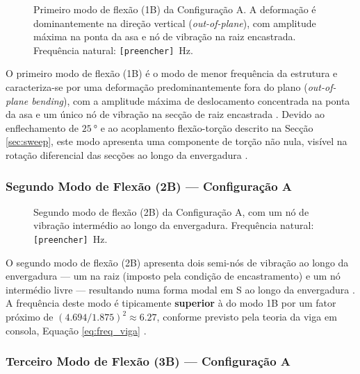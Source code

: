 \documentclass[a4paper,fleqn,noprintline]{cas-dc}
\begin{document}
\begin{figure}[h!]
    \centering
    \caption{Primeiro modo de flexão (1B) da Configuração A. 
    A deformação é dominantemente na direção vertical 
    (\textit{out-of-plane}), com amplitude máxima na ponta 
    da asa e nó de vibração na raiz encastrada. 
    Frequência natural: \texttt{[preencher]}~\si{\hertz}.}
    \label{fig:modo1a}
\end{figure}

O primeiro modo de flexão (1B) é o modo de menor frequência da estrutura e caracteriza-se por uma deformação predominantemente fora do plano (\textit{out-of-plane bending}), com a amplitude máxima de deslocamento concentrada na ponta da asa e um único nó de vibração na secção de raiz encastrada \cite{Bisplinghoff1996}. Devido ao enflechamento de $\qty{25}{\degree}$ e ao acoplamento flexão-torção descrito na Secção \ref{sec:sweep}, este modo apresenta uma componente de torção não nula, visível na rotação diferencial das secções ao longo da envergadura \cite{Wright2015}.

\subsubsection{Segundo Modo de Flexão (2B) --- Configuração A}

\begin{figure}[h!]
    \centering
    \caption{Segundo modo de flexão (2B) da Configuração A, 
    com um nó de vibração intermédio ao longo da envergadura. 
    Frequência natural: \texttt{[preencher]}~\si{\hertz}.}
    \label{fig:modo2a}
\end{figure}

O segundo modo de flexão (2B) apresenta dois semi-nós de vibração ao longo da envergadura --- um na raiz (imposto pela condição de encastramento) e um nó intermédio livre --- resultando numa forma modal em S ao longo da envergadura \cite{Rao2011}. A frequência deste modo é tipicamente \textbf{superior} à do modo 1B por um fator próximo de $(4.694/1.875)^2 \approx 6.27$, conforme previsto pela teoria da viga em consola, Equação \eqref{eq:freq_viga} \cite{Rao2011}.

\subsubsection{Terceiro Modo de Flexão (3B) --- Configuração A}
\end{document}
